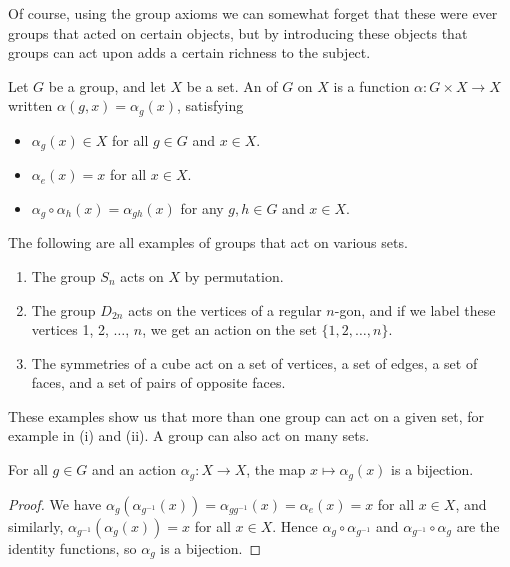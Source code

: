 \documentclass[a4paper]{scrartcl}
\begin{document}
Of course, using the group axioms we can somewhat forget that these were ever groups that acted on certain objects, but by introducing these objects that groups can act upon adds a certain richness to the subject.

\begin{definition}
Let $G$ be a group, and let $X$ be a set. An  of $G$ on $X$ is a function $\alpha : G \times X \rightarrow X$ written $\alpha(g, x) = \alpha_g(x)$, satisfying
\begin{itemize}
	\item $\alpha_g(x) \in X$ for all $g \in G$ and $x \in X$.
	\item $\alpha_e(x) = x$ for all $x \in X$.
	\item $\alpha_g \circ \alpha_h (x) = \alpha_{gh}(x)$ for any $g, h \in G$ and $x \in X$.
\end{itemize}
\end{definition}

\begin{example}
The following are all examples of groups that act on various sets.
\begin{enumerate}[label=(\roman*)]
	\item The group $S_n$ acts on $X$ by permutation.
	\item The group $D_{2n}$ acts on the vertices of a regular $n$-gon, and if we label these vertices 1, 2, $\dots$, $n$, we get an action on the set $\{1, 2, \dots, n\}$.
	\item The symmetries of a cube act on a set of vertices, a set of edges, a set of faces, and a set of pairs of opposite faces.
\end{enumerate}
\end{example}

\begin{remark}
	These examples show us that more than one group can act on a given set, for example in (i) and (ii). A group can also act on many sets.
\end{remark}

\begin{lemma}\label{lemma:bijection}
	For all $g \in G$ and an action $\alpha_g: X \rightarrow X$, the map $x \mapsto \alpha_g(x)$ is a bijection.
\end{lemma}
\begin{proof}
	We have $\alpha_g(\alpha_{g^{-1}}(x)) = \alpha_{g g^{-1}}(x) = \alpha_e(x) = x$ for all $x \in X$, and similarly, $\alpha_{g^{-1}}(\alpha_g(x)) = x$ for all $x \in X$. Hence $\alpha_g \circ \alpha_{g^{-1}}$ and $\alpha_{g^{-1}} \circ \alpha_{g}$ are the identity functions, so $\alpha_g$ is a bijection.
\end{proof}
\end{document}
